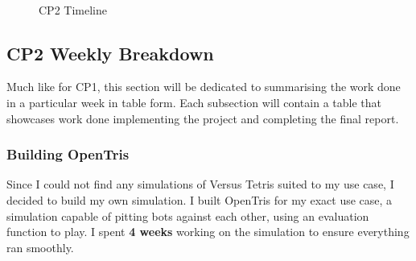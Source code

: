 \documentclass[a4paper, 12pt]{extreport}
\begin{document}
	\begin{landscape}
		\begin{figure}
			\centering
			\begin{ganttchart}[x unit=1cm, vgrid=dotted, hgrid = true]{1}{13}
				\\
				\\
				\\
				\\
				\\
				\\
				\\
				\\
				\\
				\\
				\\
			\end{ganttchart}
			\caption{CP2 Timeline}
		\end{figure}
	\end{landscape}
	
	\subsection{CP2 Weekly Breakdown}
	
		Much like for CP1, this section will be dedicated to summarising the work done in a particular week in table form. Each subsection will contain a table that showcases work done implementing the project and completing the final report.
		
		\subsubsection{Building OpenTris}
		
			Since I could not find any simulations of Versus Tetris suited to my use case, I decided to build my own simulation. I built OpenTris for my exact use case, a simulation capable of pitting bots against each other, using an evaluation function to play. I spent \textbf{4 weeks} working on the simulation to ensure everything ran smoothly.
			
\end{document}
